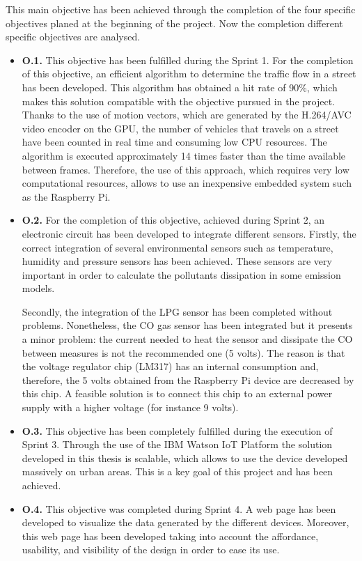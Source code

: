 This main objective has been achieved through the completion of the four specific objectives planed at the beginning of the project. Now the completion different specific objectives are analysed.
\begin{itemize}
	\item \textbf{O.1.} This objective has been fulfilled during the Sprint 1. For the completion of this objective, an efficient algorithm to determine the traffic flow in a street has been developed. This algorithm has obtained a hit rate of 90\%, which makes this solution compatible with the objective pursued in the project. Thanks to the use of motion vectors, which are generated by the H.264/AVC video encoder on the \ac{GPU}, the number of vehicles that travels on a street have been counted in real time and consuming low CPU resources. The algorithm is executed approximately 14 times faster than the time available between frames. Therefore, the use of this approach, which requires very low computational resources, allows to use an inexpensive embedded system such as the Raspberry Pi.
	
	\item \textbf{O.2.} For the completion of this objective, achieved during Sprint 2, an electronic circuit has been developed to integrate different sensors. Firstly, the correct integration of several environmental sensors such as temperature, humidity and pressure sensors has been achieved. These sensors are very important in order to calculate the pollutants dissipation in some emission models. 
	
	Secondly, the integration of the LPG sensor has been completed without problems. Nonetheless, the CO gas sensor has been integrated but it presents a minor problem: the current needed to heat the sensor and dissipate the CO between measures is not the recommended one (5 volts). The reason is that the voltage regulator chip (LM317) has an internal consumption and, therefore, the 5 volts obtained from the Raspberry Pi device are decreased by this chip. A feasible solution is to connect this chip to an external power supply with a higher voltage (for instance 9 volts).
	
	\item \textbf{O.3.} This objective has been completely fulfilled during the execution of Sprint 3. Through the use of the IBM Watson IoT Platform the solution developed in this thesis is scalable, which allows to use the device developed massively on urban areas. This is a key goal of this project and has been achieved.
	
	\item \textbf{O.4.} This objective was completed during Sprint 4. A web page has been developed to visualize the data generated by the different devices. Moreover, this web page has been developed taking into account the affordance, usability, and visibility of the design in order to ease its use.
\end{itemize}


